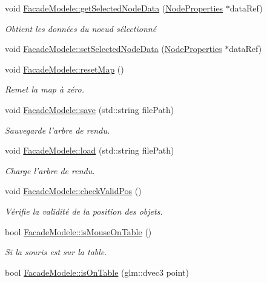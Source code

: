 \begin{DoxyCompactItemize}
void \hyperlink{group__inf2990_ga7dfe6c0df984dd4d2c5402d9fab0fc75}{Facade\-Modele\-::get\-Selected\-Node\-Data} (\hyperlink{struct_node_properties}{Node\-Properties} $\ast$data\-Ref)
\begin{DoxyCompactList}\small\item\em Obtient les données du noeud sélectionné \end{DoxyCompactList}\item 
void \hyperlink{group__inf2990_gae40b907a6c30f55176cde6b1736eaf72}{Facade\-Modele\-::set\-Selected\-Node\-Data} (\hyperlink{struct_node_properties}{Node\-Properties} $\ast$data\-Ref)
\item 
void \hyperlink{group__inf2990_gace5ff9435d6bcf501298d401207733bf}{Facade\-Modele\-::reset\-Map} ()
\begin{DoxyCompactList}\small\item\em Remet la map à zéro. \end{DoxyCompactList}\item 
void \hyperlink{group__inf2990_ga32032b986fdb830fb158dbd354aa55e7}{Facade\-Modele\-::save} (std\-::string file\-Path)
\begin{DoxyCompactList}\small\item\em Sauvegarde l'arbre de rendu. \end{DoxyCompactList}\item 
void \hyperlink{group__inf2990_ga4a34752db2d5c26cf97baca584c27dec}{Facade\-Modele\-::load} (std\-::string file\-Path)
\begin{DoxyCompactList}\small\item\em Charge l'arbre de rendu. \end{DoxyCompactList}\item 
void \hyperlink{group__inf2990_ga612cbe4c05f2e8adfb632db4fb1a3cf0}{Facade\-Modele\-::check\-Valid\-Pos} ()
\begin{DoxyCompactList}\small\item\em Vérifie la validité de la position des objets. \end{DoxyCompactList}\item 
bool \hyperlink{group__inf2990_gaaaa7ff115548c42faa0570a3c7c4648e}{Facade\-Modele\-::is\-Mouse\-On\-Table} ()
\begin{DoxyCompactList}\small\item\em Si la souris est sur la table. \end{DoxyCompactList}\item 
\hypertarget{group__inf2990_ga58f9c6d2f80118bcdf95e1967a455bea}{bool \hyperlink{group__inf2990_ga58f9c6d2f80118bcdf95e1967a455bea}{Facade\-Modele\-::is\-On\-Table} (glm\-::dvec3 point)}\label{group__inf2990_ga58f9c6d2f80118bcdf95e1967a455bea}


\end{DoxyCompactItemize}

